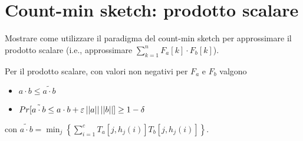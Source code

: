 \chapter{Count-min sketch: prodotto scalare}

\begin{problem*}
    Mostrare come utilizzare il paradigma del count-min sketch per approssimare il
    prodotto scalare (i.e., approssimare \(\sum_{k=1}^n{F_a[k]\cdot F_b[k]}\)).
\end{problem*}

\begin{lemma}[Approssimazione]
    Per il prodotto scalare, con valori non negativi per $F_a$ e $F_b$ valgono
    \begin{itemize}
        \item $a \cdot b \le \tilde{a \cdot b}$
        \item $Pr[\tilde{a \cdot b} \le a \cdot b
            + \varepsilon \left|\left|a\right|\right|\left|\left|b\right|\right|] \ge 1 - \delta$
    \end{itemize}
\end{lemma}

con $\displaystyle \tilde{a \cdot b} = \min_j\left\{\sum_{i=1}^{c}T_a[j,h_j(i)]T_b[j,h_j(i)]\right\}$.

